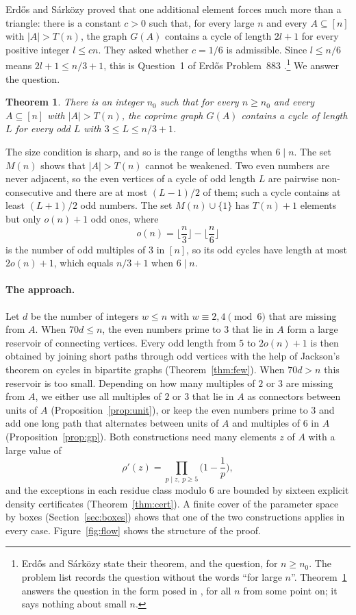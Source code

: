 \documentclass[11pt,a4paper]{article}
\newtheorem{theorem}{Theorem}[section]
\theoremstyle{definition}
\theoremstyle{remark}
\begin{document}
Erd\H{o}s and S\'ark\"ozy \cite{ES97} proved that one additional element forces much more than a
triangle: there is a constant $c>0$ such that, for every large $n$ and every $A\subseteq[n]$ with
$|A|>T(n)$, the graph $G(A)$ contains a cycle of length $2l+1$ for every positive integer $l\le cn$.
They asked whether $c=1/6$ is admissible. Since $l\le n/6$ means $2l+1\le n/3+1$, this is
Question~1 of Erd\H{o}s Problem~883 \cite{Bloom}.\footnote{Erd\H{o}s and S\'ark\"ozy state their
theorem, and the question, for $n\ge n_0$. The problem list \cite{Bloom} records the question without
the words ``for large $n$''. Theorem~\ref{thm:main} answers the question in the form posed in
\cite{ES97}, for all $n$ from some point on; it says nothing about small $n$.} We answer the
question.

\begin{theorem}\label{thm:main}
There is an integer $n_0$ such that for every $n\ge n_0$ and every $A\subseteq[n]$ with $|A|>T(n)$,
the coprime graph $G(A)$ contains a cycle of length $L$ for every odd $L$ with $3\le L\le n/3+1$.
\end{theorem}

The size condition is sharp, and so is the range of lengths when $6\mid n$. The set $M(n)$ shows
that $|A|>T(n)$ cannot be weakened. Two even numbers are never adjacent, so the even vertices of a cycle of odd
length $L$ are pairwise non-consecutive and there are at most $(L-1)/2$ of them; such a cycle
contains at least $(L+1)/2$ odd numbers. The set $M(n)\cup\{1\}$ has $T(n)+1$ elements but only
$o(n)+1$ odd ones, where
\[
  o(n)=\Big\lfloor\frac n3\Big\rfloor-\Big\lfloor\frac n6\Big\rfloor
\]
is the number of odd multiples of $3$ in $[n]$, so its odd cycles have length at most $2o(n)+1$, which
equals $n/3+1$ when $6\mid n$.

\paragraph{The approach.} Let $d$ be the number of integers $w\le n$ with $w\equiv 2,4\pmod 6$ that
are missing from $A$. When $70d\le n$, the even numbers prime to $3$ that lie in $A$ form a large
reservoir of connecting vertices. Every odd length from $5$ to $2o(n)+1$ is then obtained by joining
short paths through odd vertices with the help of Jackson's theorem on cycles in bipartite graphs
(Theorem~\ref{thm:few}). When $70d>n$ this reservoir is too small. Depending on how many multiples of
$2$ or $3$ are missing from $A$, we either use all multiples of $2$ or $3$ that lie in $A$ as
connectors between units of $A$ (Proposition~\ref{prop:unit}), or keep the even numbers prime to $3$
and add one long path that alternates between units of $A$ and multiples of $6$ in $A$
(Proposition~\ref{prop:gp}). Both constructions need many elements $z$ of $A$ with a large value of
\[
  \rho'(z)=\prod_{p\mid z,\ p\ge5}\Big(1-\frac1p\Big),
\]
and the exceptions in each residue class modulo $6$ are bounded by sixteen explicit density
certificates (Theorem~\ref{thm:cert}). A finite cover of the parameter space by boxes
(Section~\ref{sec:boxes}) shows that one of the two constructions applies in every case.
Figure~\ref{fig:flow} shows the structure of the proof.
\end{document}
